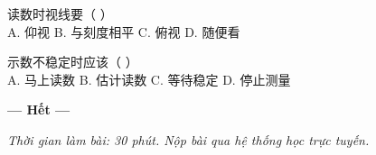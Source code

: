 \documentclass[11pt, a4paper]{article}
\begin{document}
\begin{baitap}[19]
读数时视线要（ ）\\[4pt]
A. 仰视 \quad B. 与刻度相平 \quad C. 俯视 \quad D. 随便看
\end{baitap}

\begin{baitap}[20]
示数不稳定时应该（ ）\\[4pt]
A. 马上读数 \quad B. 估计读数 \quad C. 等待稳定 \quad D. 停止测量
\end{baitap}

\vspace{0.5cm}
\begin{center}
\textbf{--- Hết ---}
\end{center}

\vspace{0.3cm}
\noindent\emph{Thời gian làm bài: 30 phút. Nộp bài qua hệ thống học trực tuyến.}
\end{document}
